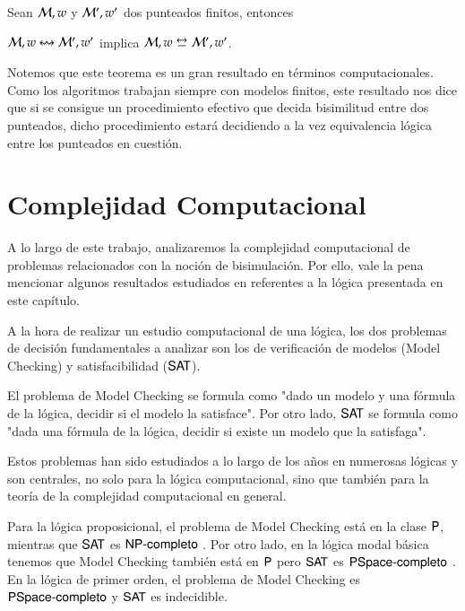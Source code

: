 \begin{teorema}\label{thm:finite-equivalence-implies-bisim}
    Sean $\mathcal{M},w$ y $\mathcal{M}',w'$ dos \ultss punteados finitos, entonces
    \begin{center}
        $\mathcal{M},w \mathrel{\leftrightsquigarrow} \mathcal{M}', w'$ implica $\model,w \bisim \model', w'$.
    \end{center}
\end{teorema}

Notemos que este teorema es un gran resultado en términos computacionales. Como los algoritmos trabajan siempre con modelos finitos, este resultado
nos dice que si se consigue un procedimiento efectivo que decida bisimilitud entre dos \ultss punteados, dicho procedimiento estará decidiendo a la vez
equivalencia lógica entre los \ultss punteados en cuestión.


\section{Complejidad Computacional}

A lo largo de este trabajo, analizaremos la complejidad computacional de problemas relacionados con la noción de bisimulación. 
Por ello, vale la pena mencionar algunos resultados estudiados en \cite{ArecesFSV25,SaraviaPHD} referentes a la lógica presentada en este 
capítulo. 

A la hora de realizar un estudio computacional de una lógica, los dos problemas de decisión fundamentales a analizar son los de 
verificación de modelos (Model Checking) y satisfacibilidad ($\rm\textsf{SAT}$).

El problema de Model Checking se formula como "dado un modelo y una fórmula de la lógica, decidir si el modelo la satisface". Por otro lado, 
$\rm\textsf{SAT}$ se formula como "dada una fórmula de la lógica, decidir si existe un modelo que la satisfaga". 

Estos problemas han sido estudiados a lo largo de los años en numerosas lógicas y son centrales, no solo para la lógica computacional, sino que 
también para la teoría de la complejidad computacional en general. 

Para la lógica proposicional, el problema de Model Checking está en la clase $\rm\textsf{P}$, mientras que $\rm\textsf{SAT}$ es $\rm\textsf{NP-completo}$ 
\cite[Capítulo 2, Sección 3]{Goldreich_2008}. Por otro lado, en la lógica modal básica tenemos que Model Checking también 
está en $\rm\textsf{P}$ pero $\rm\textsf{SAT}$ es $\rm\textsf{PSpace-completo}$ \cite[Capítulo 4]{HandbookModalLogic}. En la lógica de primer orden, el problema de 
Model Checking es $\rm\textsf{PSpace-completo}$ \cite[Capítulo 5, Sección 4]{Goldreich_2008} y $\rm\textsf{SAT}$ es indecidible. 

